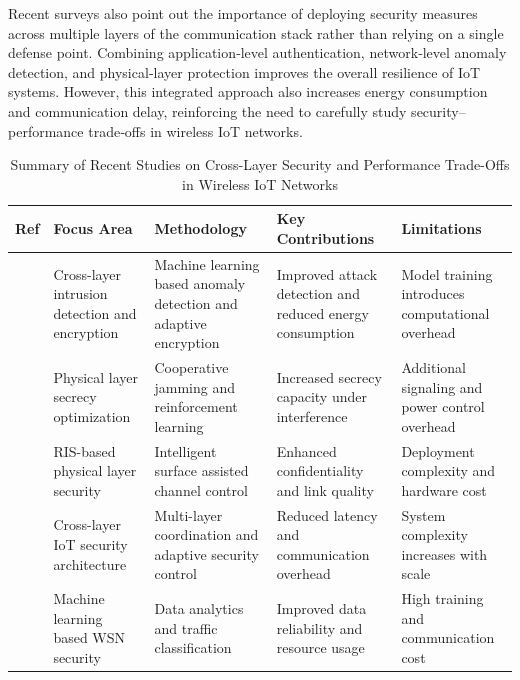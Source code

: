 \documentclass[a4paper,fleqn]{cas-dc}
\numberwithin{equation}{section}
\begin{document}
Recent surveys also point out the importance of deploying security measures across multiple layers of the communication stack rather than relying on a single defense point. Combining application‐level authentication, network‐level anomaly detection, and physical‐layer protection improves the overall resilience of IoT systems. However, this integrated approach also increases energy consumption and communication delay, reinforcing the need to carefully study security–performance trade‐offs in wireless IoT networks.
\begin{table}[htbp]
\centering
\caption{Summary of Recent Studies on Cross-Layer Security and Performance Trade-Offs in Wireless IoT Networks}
\label{tab:literature}
\renewcommand{\arraystretch}{1.15}
\setlength{\tabcolsep}{6pt}
\footnotesize

\begin{tabular}{|c|p{3.2cm}|p{4.0cm}|p{4.0cm}|p{4.0cm}|}
\hline
\textbf{Ref} & \textbf{Focus Area} & \textbf{Methodology} & \textbf{Key Contributions} & \textbf{Limitations} \\
\hline

\cite{etman2025mlwsn} & Cross-layer intrusion detection and encryption & Machine learning based anomaly detection and adaptive encryption & Improved attack detection and reduced energy consumption & Model training introduces computational overhead \\
\hline

\cite{kaur2024ris} & Physical layer secrecy optimization & Cooperative jamming and reinforcement learning & Increased secrecy capacity under interference & Additional signaling and power control overhead \\
\hline

\cite{martalo2024crosslayer} & RIS-based physical layer security & Intelligent surface assisted channel control & Enhanced confidentiality and link quality & Deployment complexity and hardware cost \\
\hline

\cite{mustafa2024framework} & Cross-layer IoT security architecture & Multi-layer coordination and adaptive security control & Reduced latency and communication overhead & System complexity increases with scale \\
\hline

\cite{mustafa2025ml} & Machine learning based WSN security & Data analytics and traffic classification & Improved data reliability and resource usage & High training and communication cost \\
\hline


\end{tabular}
\end{table}
\end{document}
